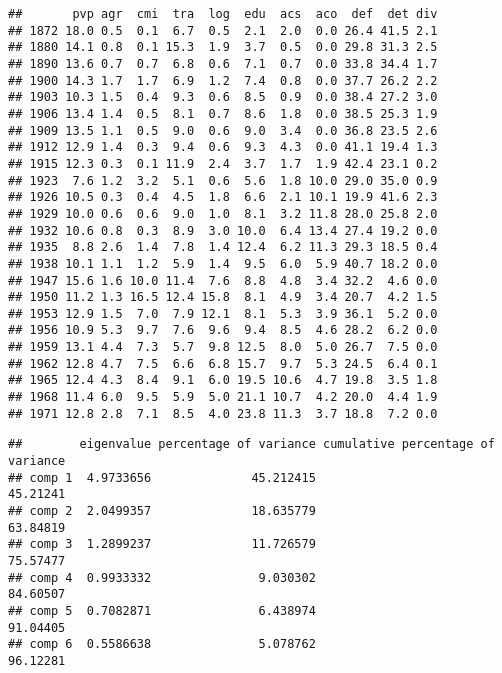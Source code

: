 \documentclass[
]{article}
\newenvironment{Shaded}{\begin{snugshade}}{\end{snugshade}}
\newcommand{\AttributeTok}[1]{\textcolor[rgb]{0.77,0.63,0.00}{#1}}
\newcommand{\DecValTok}[1]{\textcolor[rgb]{0.00,0.00,0.81}{#1}}
\newcommand{\FunctionTok}[1]{\textcolor[rgb]{0.00,0.00,0.00}{#1}}
\newcommand{\NormalTok}[1]{#1}
\newcommand{\OtherTok}[1]{\textcolor[rgb]{0.56,0.35,0.01}{#1}}
\newcommand{\SpecialCharTok}[1]{\textcolor[rgb]{0.00,0.00,0.00}{#1}}
\begin{document}
\begin{verbatim}
##       pvp agr  cmi  tra  log  edu  acs  aco  def  det div
## 1872 18.0 0.5  0.1  6.7  0.5  2.1  2.0  0.0 26.4 41.5 2.1
## 1880 14.1 0.8  0.1 15.3  1.9  3.7  0.5  0.0 29.8 31.3 2.5
## 1890 13.6 0.7  0.7  6.8  0.6  7.1  0.7  0.0 33.8 34.4 1.7
## 1900 14.3 1.7  1.7  6.9  1.2  7.4  0.8  0.0 37.7 26.2 2.2
## 1903 10.3 1.5  0.4  9.3  0.6  8.5  0.9  0.0 38.4 27.2 3.0
## 1906 13.4 1.4  0.5  8.1  0.7  8.6  1.8  0.0 38.5 25.3 1.9
## 1909 13.5 1.1  0.5  9.0  0.6  9.0  3.4  0.0 36.8 23.5 2.6
## 1912 12.9 1.4  0.3  9.4  0.6  9.3  4.3  0.0 41.1 19.4 1.3
## 1915 12.3 0.3  0.1 11.9  2.4  3.7  1.7  1.9 42.4 23.1 0.2
## 1923  7.6 1.2  3.2  5.1  0.6  5.6  1.8 10.0 29.0 35.0 0.9
## 1926 10.5 0.3  0.4  4.5  1.8  6.6  2.1 10.1 19.9 41.6 2.3
## 1929 10.0 0.6  0.6  9.0  1.0  8.1  3.2 11.8 28.0 25.8 2.0
## 1932 10.6 0.8  0.3  8.9  3.0 10.0  6.4 13.4 27.4 19.2 0.0
## 1935  8.8 2.6  1.4  7.8  1.4 12.4  6.2 11.3 29.3 18.5 0.4
## 1938 10.1 1.1  1.2  5.9  1.4  9.5  6.0  5.9 40.7 18.2 0.0
## 1947 15.6 1.6 10.0 11.4  7.6  8.8  4.8  3.4 32.2  4.6 0.0
## 1950 11.2 1.3 16.5 12.4 15.8  8.1  4.9  3.4 20.7  4.2 1.5
## 1953 12.9 1.5  7.0  7.9 12.1  8.1  5.3  3.9 36.1  5.2 0.0
## 1956 10.9 5.3  9.7  7.6  9.6  9.4  8.5  4.6 28.2  6.2 0.0
## 1959 13.1 4.4  7.3  5.7  9.8 12.5  8.0  5.0 26.7  7.5 0.0
## 1962 12.8 4.7  7.5  6.6  6.8 15.7  9.7  5.3 24.5  6.4 0.1
## 1965 12.4 4.3  8.4  9.1  6.0 19.5 10.6  4.7 19.8  3.5 1.8
## 1968 11.4 6.0  9.5  5.9  5.0 21.1 10.7  4.2 20.0  4.4 1.9
## 1971 12.8 2.8  7.1  8.5  4.0 23.8 11.3  3.7 18.8  7.2 0.0
\end{verbatim}

\begin{Shaded}
\end{Shaded}

\begin{verbatim}
##        eigenvalue percentage of variance cumulative percentage of variance
## comp 1  4.9733656              45.212415                          45.21241
## comp 2  2.0499357              18.635779                          63.84819
## comp 3  1.2899237              11.726579                          75.57477
## comp 4  0.9933332               9.030302                          84.60507
## comp 5  0.7082871               6.438974                          91.04405
## comp 6  0.5586638               5.078762                          96.12281
\end{verbatim}
\end{document}

